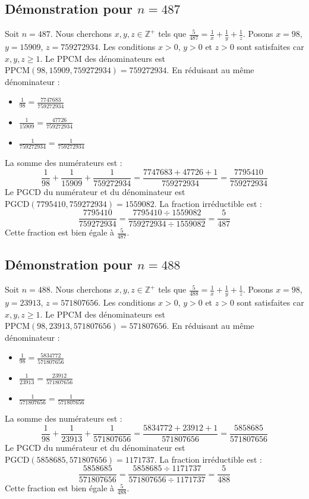 \documentclass[11pt,a4paper]{article}
\begin{document}
\subsection{Démonstration pour $n = 487$}
Soit $n = 487$. Nous cherchons $x, y, z \in \mathbb{Z}^{+}$ tels que $\frac{5}{487} = \frac{1}{x} + \frac{1}{y} + \frac{1}{z}$.
Posons $x = 98$, $y = 15909$, $z = 759272934$.
Les conditions $x > 0$, $y > 0$ et $z > 0$ sont satisfaites car $x, y, z \geq 1$.
Le PPCM des dénominateurs est $\text{PPCM}(98, 15909, 759272934) = 759272934$.
En réduisant au même dénominateur :
\begin{itemize}
    \item $\frac{1}{98} = \frac{7747683}{759272934}$
    \item $\frac{1}{15909} = \frac{47726}{759272934}$
    \item $\frac{1}{759272934} = \frac{1}{759272934}$
\end{itemize}
La somme des numérateurs est :
$$ \frac{1}{98} + \frac{1}{15909} + \frac{1}{759272934} = \frac{7747683 + 47726 + 1}{759272934} = \frac{7795410}{759272934} $$
Le PGCD du numérateur et du dénominateur est $\text{PGCD}(7795410, 759272934) = 1559082$.
La fraction irréductible est :
$$ \frac{7795410}{759272934} = \frac{7795410 \div 1559082}{759272934 \div 1559082} = \frac{5}{487} $$
Cette fraction est bien égale à $\frac{5}{487}$.

\subsection{Démonstration pour $n = 488$}
Soit $n = 488$. Nous cherchons $x, y, z \in \mathbb{Z}^{+}$ tels que $\frac{5}{488} = \frac{1}{x} + \frac{1}{y} + \frac{1}{z}$.
Posons $x = 98$, $y = 23913$, $z = 571807656$.
Les conditions $x > 0$, $y > 0$ et $z > 0$ sont satisfaites car $x, y, z \geq 1$.
Le PPCM des dénominateurs est $\text{PPCM}(98, 23913, 571807656) = 571807656$.
En réduisant au même dénominateur :
\begin{itemize}
    \item $\frac{1}{98} = \frac{5834772}{571807656}$
    \item $\frac{1}{23913} = \frac{23912}{571807656}$
    \item $\frac{1}{571807656} = \frac{1}{571807656}$
\end{itemize}
La somme des numérateurs est :
$$ \frac{1}{98} + \frac{1}{23913} + \frac{1}{571807656} = \frac{5834772 + 23912 + 1}{571807656} = \frac{5858685}{571807656} $$
Le PGCD du numérateur et du dénominateur est $\text{PGCD}(5858685, 571807656) = 1171737$.
La fraction irréductible est :
$$ \frac{5858685}{571807656} = \frac{5858685 \div 1171737}{571807656 \div 1171737} = \frac{5}{488} $$
Cette fraction est bien égale à $\frac{5}{488}$.
\end{document}
